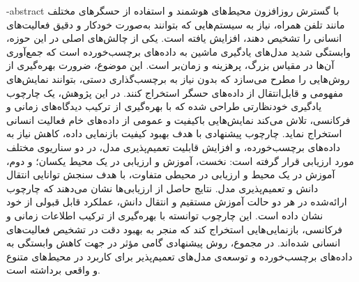 
\fa-abstract{
با گسترش روزافزون محیط‌های هوشمند و استفاده از حسگرهای مختلف مانند تلفن همراه، نیاز به سیستم‌هایی که بتوانند به‌صورت خودکار و دقیق فعالیت‌های انسانی را تشخیص دهند، افزایش یافته است. یکی از چالش‌های اصلی در این حوزه، وابستگی شدید مدل‌های یادگیری ماشین به داده‌های برچسب‌خورده است که جمع‌آوری آن‌ها در مقیاس بزرگ، پرهزینه و زمان‌بر است. این موضوع، ضرورت بهره‌گیری از روش‌هایی را مطرح می‌سازد که بدون نیاز به برچسب‌گذاری دستی، بتوانند نمایش‌های مفهومی و قابل‌انتقال از داده‌های حسگر استخراج کنند. در این پژوهش، یک چارچوب یادگیری خودنظارتی طراحی شده که با بهره‌گیری از ترکیب دیدگاه‌های زمانی و فرکانسی، تلاش می‌کند نمایش‌هایی باکیفیت و عمومی از داده‌های خام فعالیت انسانی استخراج نماید. چارچوب پیشنهادی با هدف بهبود کیفیت بازنمایی داده، کاهش نیاز به داده‌های برچسب‌خورده، و افزایش قابلیت تعمیم‌پذیری مدل، در دو سناریوی مختلف مورد ارزیابی قرار گرفته است: نخست، آموزش و ارزیابی در یک محیط یکسان؛ و دوم، آموزش در یک محیط و ارزیابی در محیطی متفاوت، با هدف سنجش توانایی انتقال دانش و تعمیم‌پذیری مدل. نتایج حاصل از ارزیابی‌ها نشان می‌دهند که چارچوب ارائه‌شده در هر دو حالت آموزش مستقیم و انتقال دانش، عملکرد قابل قبولی از خود نشان داده است. این چارچوب توانسته با بهره‌گیری از ترکیب اطلاعات زمانی و فرکانسی، بازنمایی‌هایی استخراج کند که منجر به بهبود دقت در تشخیص فعالیت‌های انسانی شده‌اند. در مجموع، روش پیشنهادی گامی مؤثر در جهت کاهش وابستگی به داده‌های برچسب‌خورده و توسعه‌ی مدل‌های تعمیم‌پذیر برای کاربرد در محیط‌های متنوع و واقعی برداشته است.
}


